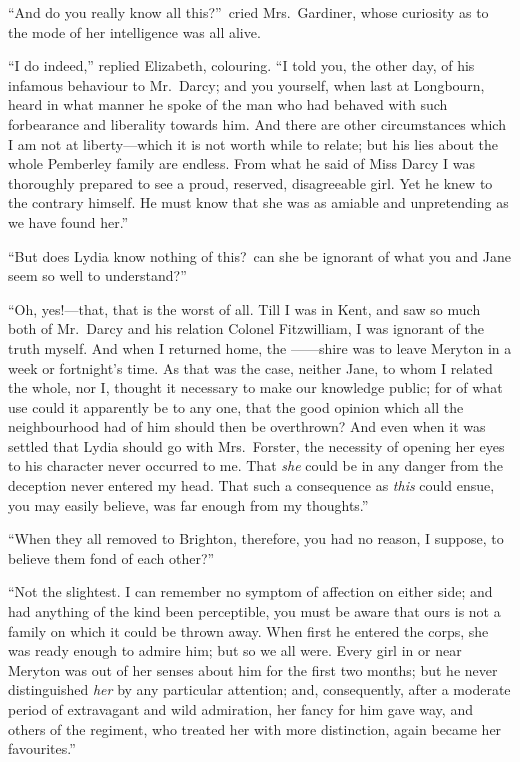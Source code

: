 \documentclass[12pt,english]{book}
\begin{document}
{}``And do you really know all this?''\ cried Mrs.\ Gardiner,
whose curiosity as to the mode of her intelligence was all alive.

{}``I do indeed,'' replied Elizabeth, colouring. {}``I told you,
the other day, of his infamous behaviour to Mr.\ Darcy; and you yourself,
when last at Longbourn, heard in what manner he spoke of the man who
had behaved with such forbearance and liberality towards him. And
there are other circumstances which I am not at liberty\mbox{---}which
it is not worth while to relate; but his lies about the whole Pemberley
family are endless. From what he said of Miss Darcy I was thoroughly
prepared to see a proud, reserved, disagreeable girl. Yet he knew
to the contrary himself. He must know that she was as amiable and
unpretending as we have found her.''

{}``But does Lydia know nothing of this?\ can she be ignorant of
what you and Jane seem so well to understand?''\ 

{}``Oh, yes!\mbox{---}that, that is the worst of all. Till I was
in Kent, and saw so much both of Mr.\ Darcy and his relation Colonel
Fitzwilliam, I was ignorant of the truth myself. And when I returned
home, the \mbox{------}shire was to leave Meryton in a week or fortnight's
time. As that was the case, neither Jane, to whom I related the whole,
nor I, thought it necessary to make our knowledge public; for of what
use could it apparently be to any one, that the good opinion which
all the neighbourhood had of him should then be overthrown? And even
when it was settled that Lydia should go with Mrs.\ Forster, the
necessity of opening her eyes to his character never occurred to me.
That \textit{she} could be in any danger from the deception never
entered my head. That such a consequence as \textit{this} could ensue,
you may easily believe, was far enough from my thoughts.''

{}``When they all removed to Brighton, therefore, you had no reason,
I suppose, to believe them fond of each other?''\ 

{}``Not the slightest. I can remember no symptom of affection on
either side; and had anything of the kind been perceptible, you must
be aware that ours is not a family on which it could be thrown away.
When first he entered the corps, she was ready enough to admire him;
but so we all were. Every girl in or near Meryton was out of her senses
about him for the first two months; but he never distinguished \textit{her}
by any particular attention; and, consequently, after a moderate period
of extravagant and wild admiration, her fancy for him gave way, and
others of the regiment, who treated her with more distinction, again
became her favourites.''
\end{document}
